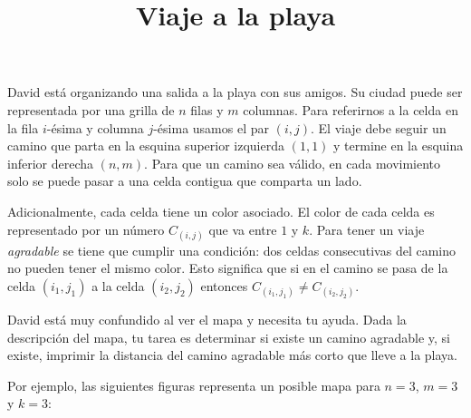 \documentclass{oci}
\title{Viaje a la playa}
\begin{document}
\begin{problemDescription}
David está organizando una salida a la playa con sus amigos.
%
Su ciudad puede ser representada por una grilla de $n$ filas y $m$ columnas.
%
Para referirnos a la celda en la fila $i$-ésima y columna $j$-ésima usamos el par
$(i,j)$.
%
El viaje debe seguir un camino que parta en la esquina superior izquierda
$(1,1)$ y termine en la esquina inferior derecha $(n,m)$.
%
Para que un camino sea válido, en cada movimiento solo se puede pasar a
una celda contigua que comparta un lado.

Adicionalmente, cada celda tiene un color asociado.
%
El color de cada celda es representado por un número $C_{(i,j)}$ que va entre $1$ y $k$.
%
Para tener un viaje \emph{agradable} se tiene que cumplir una condición: dos celdas
consecutivas del camino no pueden tener el mismo color.
%
Esto significa que si en el camino se pasa de la celda $(i_1,j_1)$ a la celda $(i_2,j_2)$
entonces $C_{(i_1,j_1)} \neq C_{(i_2,j_2)}$.

David está muy confundido al ver el mapa y necesita tu ayuda.
%
Dada la descripción del mapa, tu tarea es determinar si existe un camino agradable
y, si existe, imprimir la distancia del camino agradable más corto que lleve a la
playa.

Por ejemplo, las siguientes figuras representa un posible mapa para $n=3$, $m=3$ y $k=3$:
\begin{figure}[!h]
\centering
{}
\end{figure}


\end{problemDescription}
\end{document}
